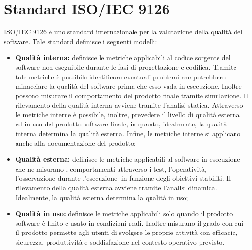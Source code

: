 \chapter{Standard ISO/IEC 9126}\label{Standard ISO/IEC 9126}
ISO/IEC 9126 è uno standard internazionale per la valutazione della qualità del software.
Tale standard definisce i seguenti modelli:
\begin{itemize}
	\item \textbf{Qualità interna:} definisce le metriche applicabili al codice sorgente del software non eseguibile durante le fasi di progettazione e codifica. Tramite tale metriche è possibile identificare eventuali problemi che potrebbero minacciare la qualità del software prima che esso vada in esecuzione. Inoltre possono misurare il comportamento del prodotto finale tramite simulazione. Il rilevamento della qualità interna avviene tramite l’analisi statica. Attraverso le metriche interne è possibile, inoltre, prevedere il livello di qualità esterna ed in uso del prodotto software finale, in quanto, idealmente, la qualità interna determina la qualità esterna. Infine, le metriche interne si applicano anche alla documentazione del prodotto;
	\item \textbf{Qualità esterna:} definisce le metriche applicabili al software in esecuzione che ne misurano i comportamenti attraverso i test, l’operatività, l’osservazione durante l’esecuzione, in funzione degli obiettivi stabiliti. Il rilevamento della qualità esterna avviene tramite l’analisi dinamica. Idealmente, la qualità esterna determina la qualità in uso;
	\item \textbf{Qualità in uso:} definisce le metriche applicabili solo quando il prodotto software è finito e usato in condizioni reali. Inoltre misurano il grado con cui il prodotto permette agli utenti di svolgere le proprie attività con efficacia, sicurezza, produttività e soddisfazione nel contesto operativo previsto. 
\end{itemize}
